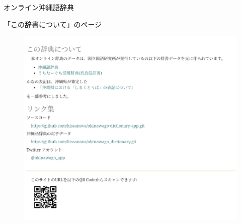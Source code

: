 \documentclass[14pt]{beamer}
\begin{document}


\begin{frame}{オンライン沖縄語辞典}
  \begin{block}{「この辞書について」のページ}
    \begin{figure}[ht]
      \centering
      \begin{minipage}{0.4\paperwidth}
        \includegraphics[height=0.4\paperheight]{okinawago-app-about.png}
      \end{minipage}%
      \begin{minipage}{0.4\textwidth}

\end{minipage}
\end{figure}
\end{block}
\end{frame}
\end{document}
